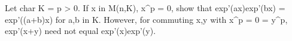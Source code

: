 Let char K = p > 0. If x in M(n,K), x^p = 0, show that exp'(ax)exp'(bx) = exp'((a+b)x) for a,b in K. However, for commuting x,y with x^p = 0 = y^p, exp'(x+y) need not equal exp'(x)exp'(y).
